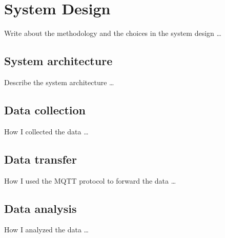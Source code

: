 \chapter{System Design}
\label{cha:system}
\vspace{0.5 cm} 

Write about the methodology and the choices in the system design \dots


\vspace{0.5 cm} 
\section{System architecture}
\label{sec:sysarc}
\vspace{0.5 cm} 

Describe the system architecture \dots


\vspace{0.5 cm} 
\section{Data collection}
\label{sec:collection}
\vspace{0.5 cm} 

How I collected the data \dots


\vspace{0.5 cm} 
\section{Data transfer}
\label{sec:transfer}
\vspace{0.5 cm} 

How I used the MQTT protocol to forward the data \dots


\vspace{0.5 cm} 
\section{Data analysis}
\label{sec:analysis}
\vspace{0.5 cm} 

How I analyzed the data \dots
